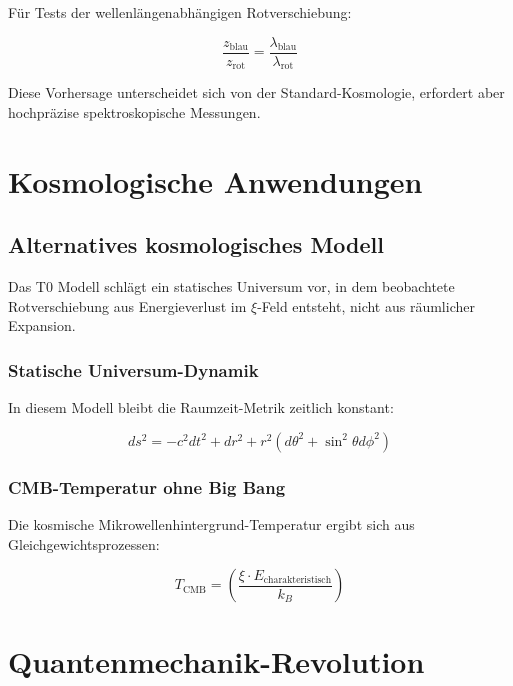 \documentclass[12pt,a4paper]{report}
\begin{document}
	Für Tests der wellenlängenabhängigen Rotverschiebung:
	
	\begin{equation}
		\frac{z_{\text{blau}}}{z_{\text{rot}}} = \frac{\lambda_{\text{blau}}}{\lambda_{\text{rot}}}
	\end{equation}
	
	Diese Vorhersage unterscheidet sich von der Standard-Kosmologie, erfordert aber hochpräzise spektroskopische Messungen.
	
	\chapter{Kosmologische Anwendungen}
	
	\section{Alternatives kosmologisches Modell}
	
	\begin{revolutionaer}
		Das T0 Modell schlägt ein statisches Universum vor, in dem beobachtete Rotverschiebung aus Energieverlust im $\xi$-Feld entsteht, nicht aus räumlicher Expansion.
	\end{revolutionaer}
	
	\subsection{Statische Universum-Dynamik}
	
	In diesem Modell bleibt die Raumzeit-Metrik zeitlich konstant:
	
	\begin{equation}
		ds^2 = -c^2 dt^2 + dr^2 + r^2(d\theta^2 + \sin^2\theta d\phi^2)
	\end{equation}
	
	\subsection{CMB-Temperatur ohne Big Bang}
	
	Die kosmische Mikrowellenhintergrund-Temperatur ergibt sich aus Gleichgewichtsprozessen:
	
	\begin{equation}
		T_{\text{CMB}} = \left(\frac{\xi \cdot E_{\text{charakteristisch}}}{k_B}\right)
	\end{equation}
	
	\chapter{Quantenmechanik-Revolution}
	
\end{document}
